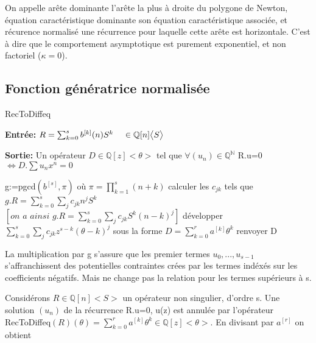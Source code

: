 \documentclass[a4paper,10.5pt]{article}
\begin{document}
	\begin{definition} On appelle arête dominante l'arête la plus à droite du polygone de Newton, équation caractéristique dominante son équation caractéristique associée, et récurence normalisé une récurrence pour laquelle cette arête est horizontale. C'est à dire que le comportement asymptotique est purement exponentiel, et non factoriel ($\kappa=0$).
	\end{definition}
	
	\subsection{Fonction génératrice normalisée}
	
	\begin{algorithm}
		\caption{RecToDiffeq}
		
		\vspace{2mm}
		
		\textbf{Entrée:} $R=\sum_{k=0}^{s} b^{[k]}(n)S^{k} \hspace{4mm} \in \mathbb{Q}[n]\big<S\big>$
		
		\textbf{Sortie:} Un opérateur $D \in \mathbb{Q}[z] \big<\theta\big>$ tel que $\forall (u_{n}) \in \mathbb{Q}^{\mathbb{N}}$ R.u=0 $\iff D.\sum u_{n}x^{n}=0$ 
		
		\begin{algorithmic}[1]
			\vspace{3mm}
			\STATE g:=pgcd$(b^{[s]},\pi)$ où $\pi=\prod_{k=1}^{s}(n+k)$
			\vspace{3mm}
			\STATE calculer les $c_{jk}$ tels que $g.R=\sum_{k=0}^{s}\sum_{j}c_{jk}n^{j}S^{k}$\\
			\vspace{3mm}
			$[\textit{on a ainsi } g.R=\sum_{k=0}^{s}\sum_{j}c_{jk}S^{k}(n-k)^{j}]$
			\vspace{3mm}
			\STATE développer $\sum_{k=0}^{s}\sum_{j} c_{jk}z^{s-k}(\theta-k)^{j}$ sous la forme $D=\sum_{k=0}^{r} a^{[k]}\theta^{k}$
			\vspace{3mm}
			\STATE renvoyer D
		\end{algorithmic}
		
	\end{algorithm}
	La multiplication par g s'assure que les premier termes $u_{0},...,u_{s-1}$
	s'affranchissent des potentielles contraintes crées par les termes indéxés sur les coefficients négatifs. Mais ne change pas la relation pour les termes supérieurs à s.
	
	Considérons $R \in \mathbb{Q}[n]\big< S\big>$ un opérateur non singulier, d'ordre s. Une solution $(u_{n})$ de la récurrence R.u=0, u(z) est annulée par l'opérateur RecToDiffeq$(R)(\theta)=\sum_{k=0}^{r}a^{[k]}\theta^{k} \in \mathbb{Q}[z]\big< \theta\big>$. En divisant par $a^{[r]}$ on obtient
	
\end{document}
